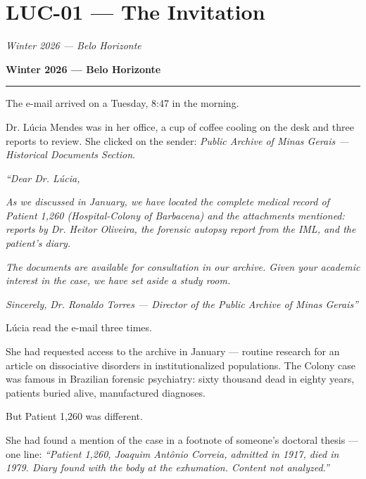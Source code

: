 \section*{\textbf{LUC-01} --- The Invitation}

\noindent \textit{Winter 2026 --- Belo Horizonte}

\noindent \textbf{Winter 2026 --- Belo Horizonte}

\vspace{0.5em}\noindent\rule{\textwidth}{0.5pt}\vspace{0.5em}

\noindent The e-mail arrived on a Tuesday, 8:47 in the morning.

\noindent Dr. Lúcia Mendes was in her office, a cup of coffee cooling on the desk and three reports to review. She clicked on the sender: \textit{Public Archive of Minas Gerais --- Historical Documents Section}.

\noindent \textit{\textquotedblleft{}Dear Dr. Lúcia,}

\noindent \textit{As we discussed in January, we have located the complete medical record of Patient 1,260 (Hospital-Colony of Barbacena) and the attachments mentioned: reports by Dr. Heitor Oliveira, the forensic autopsy report from the IML, and the patient's diary.}

\noindent \textit{The documents are available for consultation in our archive. Given your academic interest in the case, we have set aside a study room.}

\noindent \textit{Sincerely,}
\textit{Dr. Ronaldo Torres --- Director of the Public Archive of Minas Gerais\textquotedblright{}}

\noindent Lúcia read the e-mail three times.

\noindent She had requested access to the archive in January --- routine research for an article on dissociative disorders in institutionalized populations. The Colony case was famous in Brazilian forensic psychiatry: sixty thousand dead in eighty years, patients buried alive, manufactured diagnoses.

\noindent But Patient 1,260 was different.

\noindent She had found a mention of the case in a footnote of someone's doctoral thesis --- one line: \textit{\textquotedblleft{}Patient 1,260, Joaquim Antônio Correia, admitted in 1917, died in 1979. Diary found with the body at the exhumation. Content not analyzed.\textquotedblright{}}

